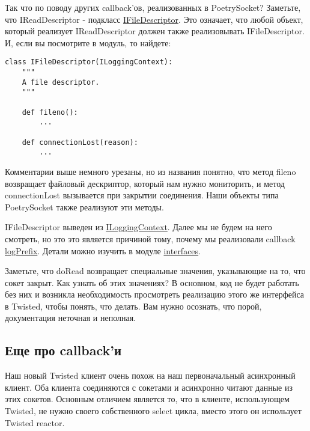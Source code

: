 Так что по поводу других callback'ов, реализованных в PoetrySocket? 
Заметьте, что IReadDescriptor - подкласс 
\href{http://twistedmatrix.com/trac/browser/tags/releases/twisted-8.2.0/twisted/internet/interfaces.py#L918}{IFileDescriptor}. Это означает, что любой объект, который реализует 
IReadDescriptor должен также реализовывать IFileDescriptor. 
И, если вы посмотрите в модуль, то найдете:

 \begin{verbatim}
class IFileDescriptor(ILoggingContext):
    """
    A file descriptor.
    """

    def fileno():
        ...

    def connectionLost(reason):
        ...
\end{verbatim} 

Комментарии выше немного урезаны, но из названия понятно, что 
метод fileno возвращает файловый дескриптор, который нам 
нужно мониторить, и метод connectionLost вызывается при 
закрытии соединения. Наши объекты типа PoetrySocket также реализуют 
эти методы.


IFileDescriptor выведен из \href{http://twistedmatrix.com/trac/browser/tags/releases/twisted-8.2.0/twisted/internet/interfaces.py#L905}{ILoggingContext}. Далее мы не будем на 
него смотреть, но это это является причиной тому, почему мы реализовали 
callback 
\href{http://github.com/jdavisp3/twisted-intro/blob/master/twisted-client-1/get-poetry.py#L110}{logPrefix}. Детали можно изучить в модуле 
\href{http://twistedmatrix.com/trac/browser/tags/releases/twisted-8.2.0/twisted/internet/interfaces.py}{interfaces}.


Заметьте, что doRead возвращает специальные значения, 
указывающие на то, что сокет закрыт. Как узнать об этих 
значениях? В основном, код не будет работать без них и 
возникла необходимость просмотреть реализацию этого же интерфейса в 
Twisted, чтобы понять, что делать. Вам нужно осознать, что 
порой, документация неточная и неполная. 


\subsection{Еще про callback'и}

Наш новый Twisted клиент очень похож на наш первоначальный 
асинхронный клиент. Оба клиента соединяются с сокетами и 
асинхронно читают данные из этих сокетов. Основным отличием является то, что 
в клиенте, использующем Twisted, не нужно своего собственного 
select цикла, вместо этого он использует Twisted reactor.  


